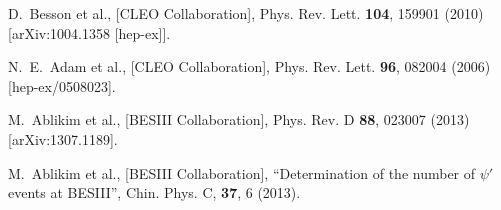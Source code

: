 \begin{thebibliography}{99}
  D.~Besson et al., [CLEO Collaboration],
  Phys. Rev. Lett. {\bf 104}, 159901 (2010)
  [arXiv:1004.1358 [hep-ex]].

  N.~E.~Adam et al., [CLEO Collaboration],
  Phys. Rev. Lett. {\bf 96}, 082004 (2006)
  [hep-ex/0508023].

  M.~Ablikim et al., [BESIII Collaboration],
  Phys. Rev. D {\bf 88}, 023007 (2013)
  [arXiv:1307.1189].

  M.~Ablikim et al., [BESIII Collaboration],
  ``Determination of the number of $\psi'$ events at BESIII'',
  Chin. Phys. C, {\bf 37}, 6 (2013).

\end{thebibliography}
